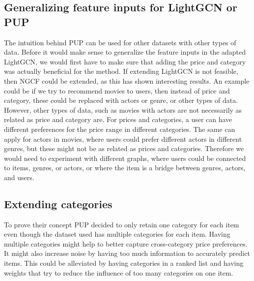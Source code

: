 \subsection{Generalizing feature inputs for LightGCN or PUP}
The intuition behind PUP can be used for other datasets with other types of data.
Before it would make sense to generalize the feature inputs in the adapted LightGCN, we would first have to make sure that adding the price and category was actually beneficial for the method.
If extending LightGCN is not feasible, then NGCF could be extended, as this has shown interesting results.
An example could be if we try to recommend movies to users, then instead of price and category, these could be replaced with actors or genre, or other types of data.
However, other types of data, such as movies with actors are not necessarily as related as price and category are.
For prices and categories, a user can have different preferences for the price range in different categories.
The same can apply for actors in movies, where users could prefer different actors in different genres, but these might not be as related as prices and categories.
Therefore we would need to experiment with different graphs, where users could be connected to items, genres, or actors, or where the item is a bridge between genres, actors, and users.

\subsection{Extending categories}
To prove their concept PUP decided to only retain one category for each item even though the dataset used has multiple categories for each item.
Having multiple categories might help to better capture cross-category price preferences.
It might also increase noise by having too much information to accurately predict items.
This could be alleviated by having categories in a ranked list and having weights that try to reduce the influence of too many categories on one item.
